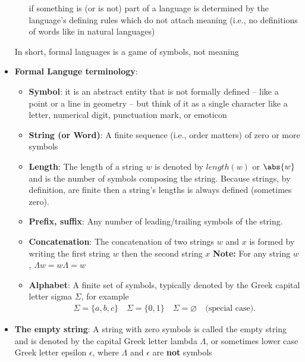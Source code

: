 \documentclass{report}
\begin{document}
\begin{itemize}
\begin{itemize}
                    if something is (or is not) part of a language is determined by the
                    language’s defining rules which do not attach meaning (i.e., no
                    definitions of words like in natural languages)
            \end{itemize}
            In short, formal languages is a game of symbols, not meaning
        \item \textbf{Formal Languge terminology}:
            \begin{itemize}
                \item \textbf{Symbol}: it is an abstract entity that is not formally defined – like a point or a line in geometry – but think of it as a single character like a letter, numerical digit, punctuation mark, or emoticon
                \item \textbf{String (or Word)}: A finite sequence (i.e., order matters) of zero or more symbols
                \item \textbf{Length}: The length of a string $w$ is denoted by $length(w)$ or $\abs{w}$ and is the number of symbols composing the string. Because strings, by definition, are finite then a string’s lengths is always defined (sometimes zero).
                \item \textbf{Prefix, suffix}: Any number of leading/trailing symbols of the string.
                \item \textbf{Concatenation}: The concatenation of two strings $w$ and $x$ is formed by writing the first string $w$ then the second string $x$
                    \bigbreak \noindent 
                    \textbf{Note:} For any string $w$, $\Lambda w = w\Lambda = w$  
                \item \textbf{Alphabet}: A finite set of symbols, typically denoted by the
                    Greek capital letter sigma $\Sigma$, for example
                    \begin{align*}
                        \Sigma = \{a,b,c\} \quad \Sigma = \{0,1\} \quad \Sigma = \varnothing \quad \text{(special case)}
                    .\end{align*}
            \end{itemize}
        \item \textbf{The empty string}:  A string with zero symbols is called the empty string
            and is denoted by the capital Greek letter lambda $\Lambda$, or sometimes
            lower case Greek letter epsilon $\epsilon$, where $\Lambda$ and $\epsilon$ are \textbf{not} symbols
            \bigbreak \noindent 

\end{itemize}
\end{document}
